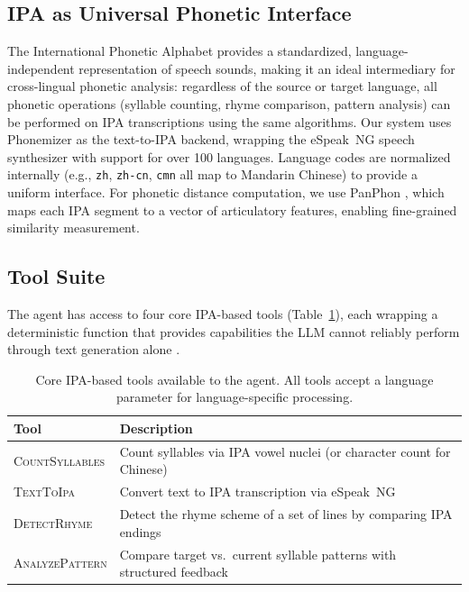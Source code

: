 \documentclass[11pt]{article}
\begin{document}
\subsection{IPA as Universal Phonetic Interface}

The International Phonetic Alphabet provides a standardized, language-independent representation of speech sounds, making it an ideal intermediary for cross-lingual phonetic analysis: regardless of the source or target language, all phonetic operations (syllable counting, rhyme comparison, pattern analysis) can be performed on IPA transcriptions using the same algorithms.
Our system uses Phonemizer \citep{bernard-titeux-2021-phonemizer} as the text-to-IPA backend, wrapping the eSpeak~NG speech synthesizer with support for over 100 languages.
Language codes are normalized internally (e.g., \texttt{zh}, \texttt{zh-cn}, \texttt{cmn} all map to Mandarin Chinese) to provide a uniform interface.
For phonetic distance computation, we use PanPhon \citep{mortensen-etal-2016-panphon}, which maps each IPA segment to a vector of articulatory features, enabling fine-grained similarity measurement.

\subsection{Tool Suite}
\label{sec:tools}

The agent has access to four core IPA-based tools (Table~\ref{tab:tools}), each wrapping a deterministic function that provides capabilities the LLM cannot reliably perform through text generation alone \citep{gao-etal-2023-pal}.

\begin{table}[t]
\centering
\small
\begin{tabular}{@{}lp{4.2cm}@{}}
\toprule
\textbf{Tool} & \textbf{Description} \\
\midrule
\textsc{CountSyllables} & Count syllables via IPA vowel nuclei (or character count for Chinese) \\
\textsc{TextToIpa} & Convert text to IPA transcription via eSpeak~NG \\
\textsc{DetectRhyme} & Detect the rhyme scheme of a set of lines by comparing IPA endings \\
\textsc{AnalyzePattern} & Compare target vs.\ current syllable patterns with structured feedback \\
\bottomrule
\end{tabular}
\caption{Core IPA-based tools available to the agent. All tools accept a language parameter for language-specific processing.}
\label{tab:tools}
\end{table}
\end{document}
